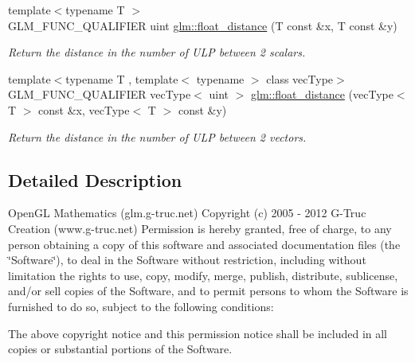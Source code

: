 \begin{DoxyCompactItemize}
\item 
{\footnotesize template$<$typename T $>$ }\\G\-L\-M\-\_\-\-F\-U\-N\-C\-\_\-\-Q\-U\-A\-L\-I\-F\-I\-E\-R uint \hyperlink{group__gtc__ulp_ga0c49c371f6b2adf02d03661e0f2499c9}{glm\-::float\-\_\-distance} (T const \&x, T const \&y)
\begin{DoxyCompactList}\small\item\em Return the distance in the number of U\-L\-P between 2 scalars. \end{DoxyCompactList}\item 
{\footnotesize template$<$typename T , template$<$ typename $>$ class vec\-Type$>$ }\\G\-L\-M\-\_\-\-F\-U\-N\-C\-\_\-\-Q\-U\-A\-L\-I\-F\-I\-E\-R vec\-Type$<$ uint $>$ \hyperlink{group__gtc__ulp_ga9b2de9eb54e59f20b20f7eccd40d435e}{glm\-::float\-\_\-distance} (vec\-Type$<$ T $>$ const \&x, vec\-Type$<$ T $>$ const \&y)
\begin{DoxyCompactList}\small\item\em Return the distance in the number of U\-L\-P between 2 vectors. \end{DoxyCompactList}\end{DoxyCompactItemize}


\subsection{Detailed Description}
Open\-G\-L Mathematics (glm.\-g-\/truc.\-net) Copyright (c) 2005 -\/ 2012 G-\/\-Truc Creation (www.\-g-\/truc.\-net) Permission is hereby granted, free of charge, to any person obtaining a copy of this software and associated documentation files (the \char`\"{}\-Software\char`\"{}), to deal in the Software without restriction, including without limitation the rights to use, copy, modify, merge, publish, distribute, sublicense, and/or sell copies of the Software, and to permit persons to whom the Software is furnished to do so, subject to the following conditions\-:

The above copyright notice and this permission notice shall be included in all copies or substantial portions of the Software.

